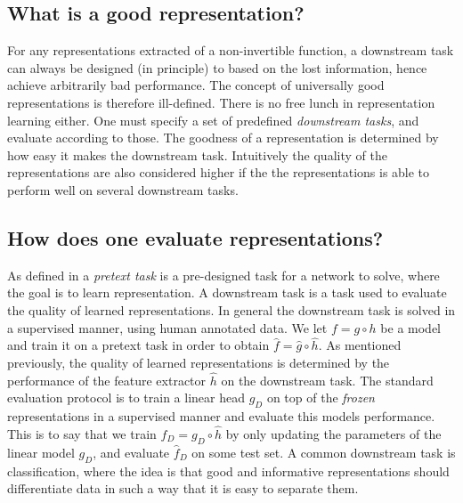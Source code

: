 \documentclass[../../thesis.tex]{subfiles}
\begin{document}
\subsection{What is a good representation?}
For any representations extracted of a non-invertible function, a downstream task can always be designed (in principle) to based on the lost information, hence achieve arbitrarily bad performance. The concept of universally good representations is therefore ill-defined. There is no free lunch in representation learning either. One must specify a set of predefined \textit{downstream tasks}, and evaluate according to those. The goodness of a representation is determined by how easy it makes the downstream task. Intuitively the quality of the representations are also considered higher if the the representations is able to perform well on several downstream tasks. 


\subsection{How does one evaluate representations?}
As defined in \cite{jing2019selfsupervised} a \textit{pretext task} is a pre-designed task for a network to solve, where the goal is to learn representation. A downstream task is a task used to evaluate the quality of learned representations. In general the downstream task is solved in a supervised manner, using human annotated data.\newline
We let $f = g\circ h$ be a model and train it on a pretext task in order to obtain $\widehat{f} = \widehat{g}\circ \widehat{h}$. As mentioned previously, the quality of learned representations is determined by the performance of the feature extractor $\widehat{h}$ on the downstream task. The standard evaluation protocol is to train a linear head $g_D$ on top of the \textit{frozen} representations in a supervised manner and evaluate this models performance. This is to say that we train  $f_D = g_D\circ \widehat{h}$ by only updating the parameters of the linear model $g_D$, and evaluate $\widehat{f}_D$ on some test set. A common downstream task is classification, where the idea is that good and informative representations should differentiate data in such a way that it is easy to separate them. \newline

\end{document}

